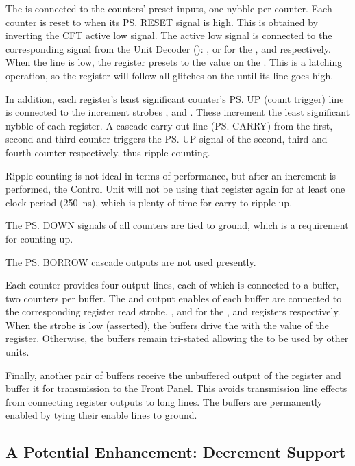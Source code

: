 The \IBUS{} is connected to the counters' preset inputs, one \gls{nybble} per
counter. Each counter is reset to  when its \ps{RESET} signal is
high. This is obtained by inverting the CFT active low  signal. The
active low  signal is connected to the corresponding signal from the
Unit Decoder (): ,  or  for the
\PC, \DR{} and \AC{} respectively. When the line is low, the register presets
to the value on the \IBUS{}. This is a latching operation, so the register will
follow all glitches on the \IBUS{} until its  line goes high.

In addition, each register's least significant counter's \ps{UP} (count
trigger) line is connected to the increment strobes \INCPC, \INCDR{} and
\INCAC{}. These increment the least significant \gls{nybble} of each
register. A cascade carry out line (\ps{CARRY}) from the first, second and
third counter triggers the \ps{UP} signal of the second, third and fourth
counter respectively, thus ripple counting.

Ripple counting is not ideal in terms of performance, but after an increment is
performed, the Control Unit will not be using that register again for at least
one clock period (250~ns), which is plenty of time for carry to ripple up.

The \ps{DOWN} signals of all counters are tied to ground, which is a
requirement for counting up.

The \ps{BORROW} cascade outputs are not used presently.

Each counter provides four output lines, each of which is connected to a
 buffer, two  counters per  buffer. The
 and  output enables of each buffer are connected to the
corresponding register read strobe, \RPC, \RDR{} and \RAC for the \PC, \DR{}
and \AC{} registers respectively. When the strobe is low (asserted), the
buffers drive the \IBUS{} with the value of the register. Otherwise, the
buffers remain tri-stated allowing the \IBUS{} to be used by other units.

Finally, another pair of  buffers receive the unbuffered output of the
register and buffer it for transmission to the Front Panel. This avoids
transmission line effects from connecting register outputs to long lines. The
buffers are permanently enabled by tying their enable lines to ground.

\subsection{A Potential Enhancement: Decrement Support}

